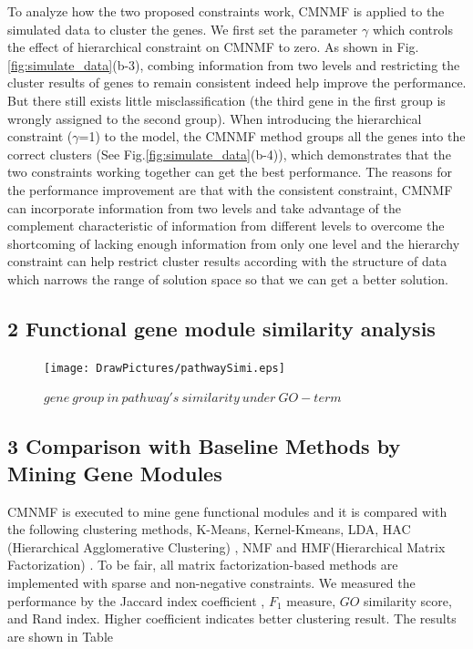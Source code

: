 \documentclass{bmcart}
\begin{document}
To analyze how the two proposed constraints work, CMNMF is applied to the simulated data to cluster the genes. We first set the parameter $\gamma$ which controls the effect of hierarchical constraint on CMNMF to zero. As shown in Fig.\ref{fig:simulate_data}(b-3), combing information from two levels and restricting the cluster results of genes to remain consistent indeed help improve the performance. But there still exists little misclassification (the third gene in the first group is wrongly assigned to the second group). When introducing the hierarchical constraint ($\gamma$=1) to the model, the CMNMF method groups all the genes into the correct clusters (See Fig.\ref{fig:simulate_data}(b-4)), which demonstrates that the two constraints working together can get the best performance. The reasons for the performance improvement are that with the consistent constraint, CMNMF can incorporate information from two levels and take advantage of the complement characteristic of information from different levels to overcome the shortcoming of lacking enough information from only one level and the hierarchy constraint can help restrict cluster results according with the structure of data which narrows the range of solution space so that we can get a better solution.

\subsection*{2 Functional gene module similarity analysis}
\begin{figure}[!h]
  \centering
 \texttt{[image: DrawPictures/pathwaySimi.eps]}
  \caption{$gene\ group\ in\ pathway's\ similarity\ under\ GO-term  $}\label{fig:alpha}
\end{figure}
\subsection*{3 Comparison with Baseline Methods by Mining Gene Modules}
CMNMF is executed to mine gene functional modules and it is compared with the following clustering methods, K-Means, Kernel-Kmeans, LDA, HAC (Hierarchical Agglomerative Clustering) \cite{HAC}, NMF and HMF(Hierarchical Matrix Factorization) \cite{HMF}. To be fair, all matrix factorization-based methods are implemented with sparse and non-negative constraints. We measured the performance by the Jaccard index coefficient \cite{cluster_survey}, $F_1$ measure, $GO$ similarity score, and Rand index. Higher coefficient indicates better clustering result. The results are shown in Table
\end{document}
